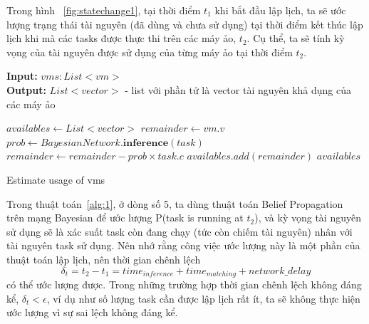 \documentclass{my_style}
\begin{document}
\noindent
Trong hình ~\ref{fig:statechange1}, tại thời điểm $t_{1}$ khi bắt đầu lập lịch, ta sẽ ước lượng trạng thái tài nguyên (đã dùng và chưa sử dụng) tại thời điểm kết thúc lập lịch khi mà các tasks được thực thi trên các máy ảo, $t_{2}$. Cụ thể, ta sẽ tính kỳ vọng của tài nguyên được sử dụng của từng máy ảo tại thời điểm $t_{2}$. 
\begin{algorithm}[H]
\textbf{Input:} $vms: List<vm>$ \\ 
\textbf{Output:} $List<vector>$ - list với phần tử là vector tài nguyên khả dụng của các máy ảo
\begin{algorithmic}[1]
	\STATE$ availables \leftarrow  List<vector>$
		\STATE $remainder \leftarrow vm.v$
			\STATE $prob \leftarrow BayesianNetwork.\textbf{inference}(task)$
			\STATE $remainder \leftarrow remainder - prob \times task.c$
		\ENDFOR
		\STATE $availables.add(remainder)$
	\ENDFOR
	\RETURN $availables$
\end{algorithmic}
\caption{Estimate usage of vms }
\label{alg:1}
\end{algorithm}

\noindent
Trong thuật toán~\ref{alg:1}, ở dòng số 5, ta dùng thuật toán Belief Propagation~\cite{29} trên mạng Bayesian để ước lượng P(task is running at $t_{2}$), và kỳ vọng tài nguyên sử dụng sẽ là xác suất task còn đang chạy (tức còn chiếm tài nguyên) nhân với tài nguyên task sử dụng. Nên nhớ rằng công việc ước lượng này là một phần của thuật toán lập lịch, nên thời gian chênh lệch 
\[
	\delta_{t} = t_{2} - t_{1} = time_{inference} + time_{matching} + network\_delay
\]
có thể ước lượng được. 
Trong những trường hợp thời gian chênh lệch không đáng kể, $\delta_{t} < \epsilon$, ví dụ như số lượng task cần được lập lịch rất ít, ta sẽ không thực hiện ước lượng vì sự sai lệch không đáng kể.
\end{document}
